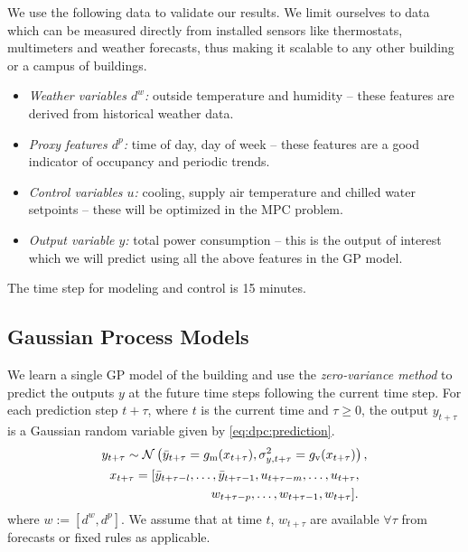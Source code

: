 We use the following data to validate our results. We limit ourselves to data which can be measured directly from installed sensors like thermostats, multimeters and weather forecasts, thus making it scalable to any other building or a campus of buildings.

\begin{itemize}
\item \textit{Weather variables \(d^w\):} outside temperature and humidity -- these features are derived from historical weather data.
\item \textit{Proxy features \(d^p\):} time of day, day of week -- these features are a good indicator of occupancy and periodic trends.
\item \textit{Control variables \(u\):} cooling, supply air temperature and chilled water setpoints -- these will be optimized in the MPC problem. %
\item \textit{Output variable \(y\):} total power consumption -- this is the output of interest which we will predict using all the above features in the GP model.
\end{itemize}

The time step for modeling and control is 15 minutes.

\subsection{Gaussian Process Models}
\label{SS:casestudy:gp}

We learn a single GP model of the building and use the \emph{zero-variance method} to predict the outputs \(y\) at the future time steps following the current time step.
For each prediction step $t+\tau$, where $t$ is the current time and \( \tau \ge 0\), %
the output \(y_{t+\tau}\) is a Gaussian random variable given by \eqref{eq:dpc:prediction}.
\begin{gather}
\label{E:gp:casestudy}
y_{t+\tau} \sim \GaussianDist{\bar{y}_{t+\tau} = g_{\mathrm m}(x_{t+\tau})}{\sigma^2_{y, t+\tau} = g_{\mathrm v}(x_{t+\tau})}, \\
x_{t + \tau} = [\bar y_{t+ \tau-l}, \dots, \bar y_{t+ \tau-1}, u_{t+ \tau-m}, \dots, u_{t+ \tau}, \nonumber \\
\qquad\qquad\qquad\qquad  w_{t+ \tau-p}, \dots, w_{t+ \tau-1}, w_{t+ \tau}]\text. \nonumber
\end{gather}
where \(w:=[d^w, d^p]\). We assume that at time \(t\), \(w_{t+\tau}\) are available \(\forall \tau \) from forecasts or fixed rules as applicable.

